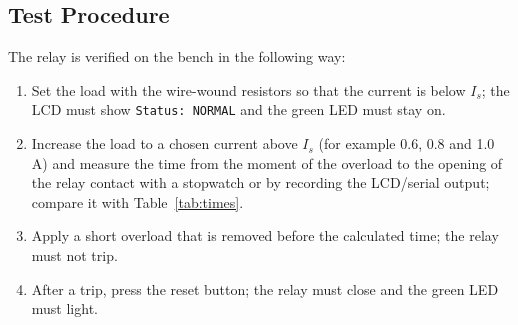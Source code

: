 \documentclass[12pt, a4paper]{article}
\begin{document}
\subsection{Test Procedure}
The relay is verified on the bench in the following way:
\begin{enumerate}[nosep]
  \item Set the load with the wire-wound resistors so that the current is below $I_s$; the LCD must show \texttt{Status: NORMAL} and the green LED must stay on.
  \item Increase the load to a chosen current above $I_s$ (for example 0.6, 0.8 and 1.0\,A) and measure the time from the moment of the overload to the opening of the relay contact with a stopwatch or by recording the LCD/serial output; compare it with Table~\ref{tab:times}.
  \item Apply a short overload that is removed before the calculated time; the relay must not trip.
  \item After a trip, press the reset button; the relay must close and the green LED must light.
\end{enumerate}

\newpage

\end{document}
